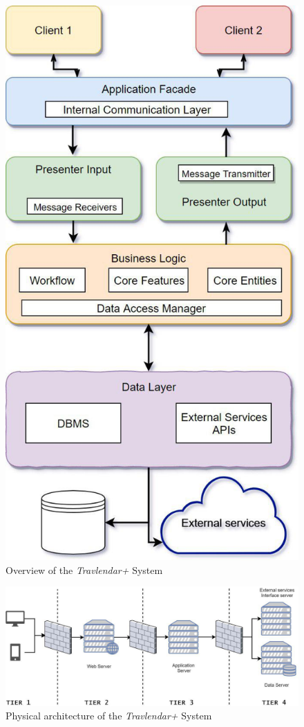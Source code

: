 \begin{figure}[H]
    \centering
    \includegraphics[scale=0.7]{Pictures/OverviewPictures/overviewDiagram.jpg}
    \caption{Overview of the \emph{Travlendar+} System}
\end{figure}

\begin{figure}[H]
    \centering
    \includegraphics[scale=0.7]{Pictures/OverviewPictures/physical.jpg}
    \caption{Physical architecture of the \emph{Travlendar+} System}
\end{figure}

